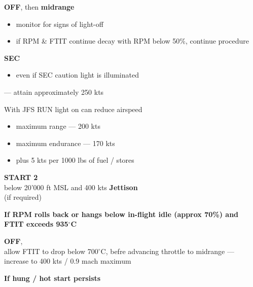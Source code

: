 \begin{checklistenumerate}
    \blueitem[Throttle]\dotfill \textbf{OFF}, then \textbf{midrange}
    \begin{itemize}
        \item monitor for signs of light-off
        \item if RPM \& FTIT continue decay with RPM below 50\%, continue procedure
    \end{itemize}
    \dotfill \textbf{SEC}
    \begin{itemize}
        \item even if SEC caution light is illuminated
    \end{itemize}
    \blueitem[Airspeed] 
    --- attain approximately 250 kts 

    \medskip
    With JFS RUN light on can reduce airspeed
    \begin{itemize}
        \item maximum range --- 200 kts
        \item maximum endurance --- 170 kts
        \item plus 5 kts per 1000 lbs of fuel / stores 
    \end{itemize}
    \dotfill \textbf{START 2}\\
    \hfill below 20'000 ft MSL and 400 kts
    \blueitem[STORES]\dotfill \textbf{Jettison}\\
    \hfill (if required)
\end{checklistenumerate}

\textbf{If RPM rolls back or hangs below in-flight idle (approx 70\%)
and FTIT exceeds 935$^\circ$C}

\begin{checklistenumerate}[resume]
    \blueitem[Throttle]\dotfill \textbf{OFF},\\
    allow FTIT to drop below 700$^\circ$C, 
    befre advancing throttle to midrange
    \blueitem[Airspeed] --- increase to 400 kts / 0.9 mach maximum
\end{checklistenumerate}

\textbf{If hung / hot start persists}

